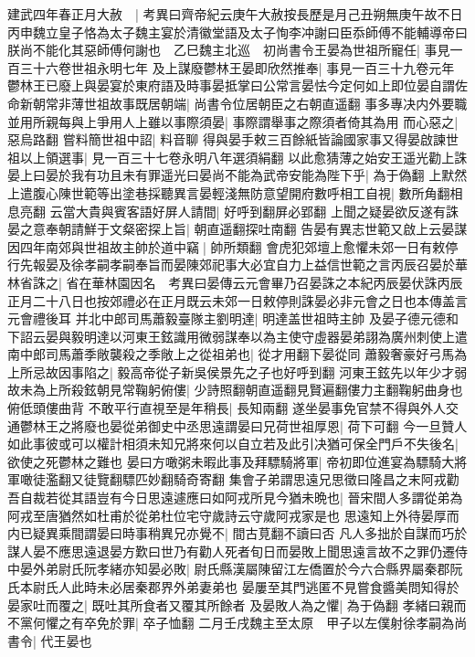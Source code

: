 建武四年春正月大赦　|{
	考異曰齊帝紀云庚午大赦按長歷是月己丑朔無庚午故不日}
丙申魏立皇子恪為太子魏主宴於清徽堂語及太子恂李冲謝曰臣忝師傅不能輔導帝曰朕尚不能化其惡師傅何謝也　乙巳魏主北巡　初尚書令王晏為世祖所寵任|{
	事見一百三十六卷世祖永明七年}
及上謀廢鬱林王晏即欣然推奉|{
	事見一百三十九卷元年}
鬱林王已廢上與晏宴於東府語及時事晏抵掌曰公常言晏怯今定何如上即位晏自謂佐命新朝常非薄世祖故事既居朝端|{
	尚書令位居朝臣之右朝直遥翻}
事多專决内外要職並用所親每與上爭用人上雖以事際須晏|{
	事際謂舉事之際須者倚其為用}
而心惡之|{
	惡烏路翻}
嘗料簡世祖中詔|{
	料音聊}
得與晏手敕三百餘紙皆論國家事又得晏啟諫世祖以上領選事|{
	見一百三十七卷永明八年選須絹翻}
以此愈猜薄之始安王遥光勸上誅晏上曰晏於我有功且未有罪遥光曰晏尚不能為武帝安能為陛下乎|{
	為于偽翻}
上默然上遣腹心陳世範等出塗巷採聽異言晏輕淺無防意望開府數呼相工自視|{
	數所角翻相息亮翻}
云當大貴與賓客語好屏人請間|{
	好呼到翻屏必郢翻}
上聞之疑晏欲反遂有誅晏之意奉朝請鮮于文粲密探上旨|{
	朝直遥翻探吐南翻}
告晏有異志世範又啟上云晏謀因四年南郊與世祖故主帥於道中竊|{
	帥所類翻}
會虎犯郊壇上愈懼未郊一日有敕停行先報晏及徐孝嗣孝嗣奉旨而晏陳郊祀事大必宜自力上益信世範之言丙辰召晏於華林省誅之|{
	省在華林園因名　考異曰晏傳云元會畢乃召晏誅之本紀丙辰晏伏誅丙辰正月二十八日也按郊禮必在正月既云未郊一日敕停則誅晏必非元會之日也本傳盖言元會禮後耳}
并北中郎司馬蕭毅臺隊主劉明達|{
	明達盖世祖時主帥}
及晏子德元德和下詔云晏與毅明達以河東王鉉識用微弱謀奉以為主使守虛器晏弟詡為廣州刺使上遣南中郎司馬蕭季敞襲殺之季敞上之從祖弟也|{
	從才用翻下晏從同}
蕭毅奢豪好弓馬為上所忌故因事陷之|{
	毅高帝從子新吳侯景先之子也好呼到翻}
河東王鉉先以年少才弱故未為上所殺鉉朝見常鞠躬俯僂|{
	少詩照翻朝直遥翻見賢遍翻僂力主翻鞠躬曲身也俯低頭僂曲背}
不敢平行直視至是年稍長|{
	長知兩翻}
遂坐晏事免官禁不得與外人交通鬱林王之將廢也晏從弟御史中丞思遠謂晏曰兄荷世祖厚恩|{
	荷下可翻}
今一旦贊人如此事彼或可以權計相須未知兄將來何以自立若及此引决猶可保全門戶不失後名|{
	欲使之死鬱林之難也}
晏曰方噉粥未暇此事及拜驃騎將軍|{
	帝初即位進宴為驃騎大將軍噉徒濫翻又徒覽翻驃匹妙翻騎奇寄翻}
集會子弟謂思遠兄思徵曰隆昌之末阿戎勸吾自裁若從其語豈有今日思遠遽應曰如阿戎所見今猶未晩也|{
	晉宋間人多謂從弟為阿戎至唐猶然如杜甫於從弟杜位宅守歲詩云守歲阿戎家是也}
思遠知上外待晏厚而内已疑異乘間謂晏曰時事稍異兄亦覺不|{
	間古莧翻不讀曰否}
凡人多拙於自謀而巧於謀人晏不應思遠退晏方歎曰世乃有勸人死者旬日而晏敗上聞思遠言故不之罪仍遷侍中晏外弟尉氏阮孝緒亦知晏必敗|{
	尉氏縣漢屬陳留江左僑置於今六合縣界屬秦郡阮氏本尉氏人此時未必居秦郡界外弟妻弟也}
晏屢至其門逃匿不見嘗食醬美問知得於晏家吐而覆之|{
	既吐其所食者又覆其所餘者}
及晏敗人為之懼|{
	為于偽翻}
孝緒曰親而不黨何懼之有卒免於罪|{
	卒子恤翻}
二月壬戌魏主至太原　甲子以左僕射徐孝嗣為尚書令|{
	代王晏也}
